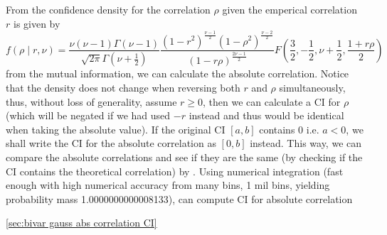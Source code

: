 \documentclass[../Thesis.tex]{subfiles}
\begin{document}
From the confidence density for the correlation $\rho$ given the emperical correlation $r$ is given by
$$f\left(\rho \mid r,\nu\right) = \frac{\nu (\nu-1) \Gamma(\nu-1)}{\sqrt{2\pi} \Gamma(\nu + \frac{1}{2})} \frac{\left(1-r^2\right)^{\frac{\nu-1}{2}} \left(1-\rho^2\right)^{\frac{\nu-2}{2}} }{\left(1-r\rho\right)^{\frac{2\nu-1}{2}}} F\left(\frac{3}{2}, -\frac{1}{2}, \nu+\frac{1}{2}, \frac{1+r\rho}{2}\right)$$
from the mutual information, we can calculate the absolute correlation. Notice that the density does not change when reversing both $r$ and $\rho$ simultaneously, thus, without loss of generality, assume $r\geq 0$, then we can calculate a CI for $\rho$ (which will be negated if we had used $-r$ instead and thus would be identical when taking the absolute value). If the original CI $[a,b]$ contains $0$ i.e. $a<0$, we shall write the CI for the absolute correlation as $[0,b]$ instead. This way, we can compare the absolute correlations and see if they are the same (by checking if the CI contains the theoretical correlation) by \cite{Confidence_in_Correlation}. Using numerical integration (fast enough with high numerical accuracy from many bins, 1 mil bins, yielding probability mass 1.0000000000008133), can compute CI for absolute correlation

\autoref{sec:bivar gauss abs correlation CI}
\end{document}
